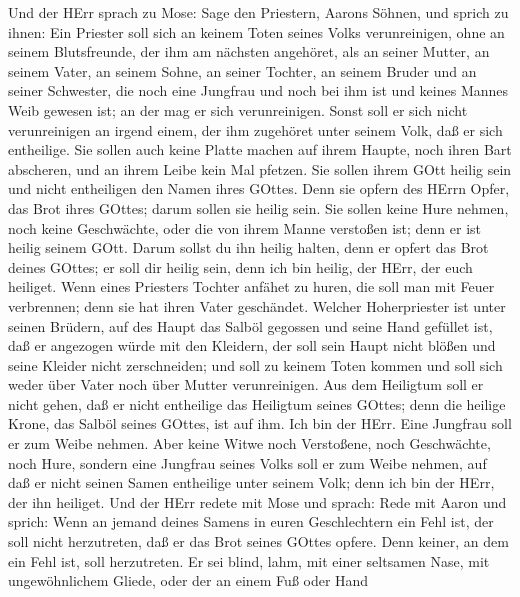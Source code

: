  Und der HErr sprach zu Mose: Sage den Priestern, Aarons
Söhnen, und sprich zu ihnen: Ein Priester soll sich an keinem Toten
seines Volks verunreinigen,  ohne an seinem Blutsfreunde,
der ihm am nächsten angehöret, als an seiner Mutter, an seinem Vater, an
seinem Sohne, an seiner Tochter, an seinem Bruder  und an
seiner Schwester, die noch eine Jungfrau und noch bei ihm ist und keines
Mannes Weib gewesen ist; an der mag er sich verunreinigen. 
Sonst soll er sich nicht verunreinigen an irgend einem, der ihm
zugehöret unter seinem Volk, daß er sich entheilige.  Sie
sollen auch keine Platte machen auf ihrem Haupte, noch ihren Bart
abscheren, und an ihrem Leibe kein Mal pfetzen.  Sie sollen
ihrem GOtt heilig sein und nicht entheiligen den Namen ihres GOttes.
Denn sie opfern des HErrn Opfer, das Brot ihres GOttes; darum sollen sie
heilig sein.  Sie sollen keine Hure nehmen, noch keine
Geschwächte, oder die von ihrem Manne verstoßen ist; denn er ist heilig
seinem GOtt.  Darum sollst du ihn heilig halten, denn er
opfert das Brot deines GOttes; er soll dir heilig sein, denn ich bin
heilig, der HErr, der euch heiliget.  Wenn eines Priesters
Tochter anfähet zu huren, die soll man mit Feuer verbrennen; denn sie
hat ihren Vater geschändet.  Welcher Hoherpriester ist
unter seinen Brüdern, auf des Haupt das Salböl gegossen und seine Hand
gefüllet ist, daß er angezogen würde mit den Kleidern, der soll sein
Haupt nicht blößen und seine Kleider nicht zerschneiden; 
und soll zu keinem Toten kommen und soll sich weder über Vater noch über
Mutter verunreinigen.  Aus dem Heiligtum soll er nicht
gehen, daß er nicht entheilige das Heiligtum seines GOttes; denn die
heilige Krone, das Salböl seines GOttes, ist auf ihm. Ich bin der HErr.
 Eine Jungfrau soll er zum Weibe nehmen.  Aber
keine Witwe noch Verstoßene, noch Geschwächte, noch Hure, sondern eine
Jungfrau seines Volks soll er zum Weibe nehmen,  auf daß er
nicht seinen Samen entheilige unter seinem Volk; denn ich bin der HErr,
der ihn heiliget.  Und der HErr redete mit Mose und sprach:
 Rede mit Aaron und sprich: Wenn an jemand deines Samens in
euren Geschlechtern ein Fehl ist, der soll nicht herzutreten, daß er das
Brot seines GOttes opfere.  Denn keiner, an dem ein Fehl
ist, soll herzutreten. Er sei blind, lahm, mit einer seltsamen Nase, mit
ungewöhnlichem Gliede,  oder der an einem Fuß oder Hand
